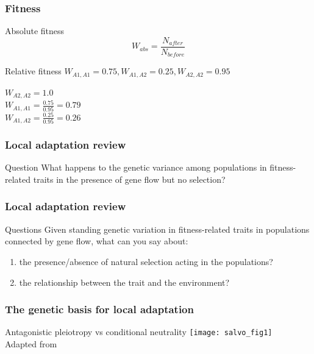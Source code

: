 \begin{frame}
\frametitle{Fitness}
\begin{block}{Absolute fitness}
\centering
\large
\begin{equation}
W_{abs} = \frac{N_{after}}{N_{before}}
\end{equation}
\end{block}

\begin{block}{Relative fitness}
\centering
$W_{A1,A1} = 0.75, W_{A1,A2} = 0.25, W_{A2,A2} = 0.95$

\vspace{2em}

$W_{A2,A2} = 1.0$\\ \vspace{1em}
$W_{A1,A1} = \frac{0.75}{0.95} = 0.79$\\ \vspace{1em}
$W_{A1,A2} = \frac{0.25}{0.95} = 0.26$\\ \vspace{1em}
\tiny
\end{block}
\end{frame}

\begin{frame}
\frametitle{Local adaptation review}
\begin{block}{Question}
\large
What happens to the genetic variance among populations in fitness-related
traits in the presence of gene flow but no selection?
\end{block}
\end{frame}

\begin{frame}
\frametitle{Local adaptation review}
\begin{block}{Questions}
\large
Given standing genetic variation in fitness-related traits in populations
connected by gene flow, what can you say about: 
\begin{enumerate}
\item{the presence/absence of natural selection acting in the populations?}
\item{the relationship between the trait and the environment?}
\end{enumerate}
\end{block}
\end{frame}

\begin{frame}
\frametitle{The genetic basis for local adaptation}
\begin{block}{Antagonistic pleiotropy vs conditional
neutrality}
\centering
\texttt{[image: salvo\_fig1]}\\
\tiny
Adapted from \citet[Figure 1]{Savolainen:2013dfa}
\end{block}
\end{frame}

